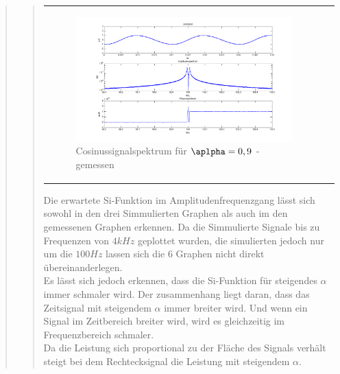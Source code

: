 \begin{quote}
\begin{quote}
\begin{center}
\begin{tabular}{ll}
\begin{minipage}{0.6\textwidth}
                    \begin{figure}[H]
                        \label{fig:}            
                        \includegraphics[scale=0.3]{./Bilder/cos_alpha9_-_gemessen.png} %
                        \caption{Cosinussignalspektrum für $\aplpha = 0,9$ - gemessen}
                    \end{figure}                
                
                \end{minipage}
                        
            \end{tabular}
            \end{center}
            
            Die erwartete Si-Funktion im Amplitudenfrequenzgang lässt sich sowohl in den drei Simmulierten Graphen als
            auch im den gemessenen Graphen erkennen. Da die Simmulierte Signale bis zu Frequenzen von $4 kHz$ geplottet
            wurden, die simulierten jedoch nur um die $100 Hz$ lassen sich die 6 Graphen nicht direkt
            übereinanderlegen.\\
            Es lässt sich jedoch erkennen, dass die Si-Funktion für steigendes $\alpha$ immer schmaler wird. Der
            zusammenhang liegt daran, dass das Zeitsignal mit steigendem $\alpha$ immer breiter wird. Und wenn ein
            Signal im Zeitbereich breiter wird, wird es gleichzeitig im Frequenzbereich schmaler.\\
            
            Da die Leistung sich proportional zu der Fläche des Signals verhält steigt bei dem Rechtecksignal die
            Leistung mit steigendem $\alpha$.
                                          

\end{quote}
\end{quote}
